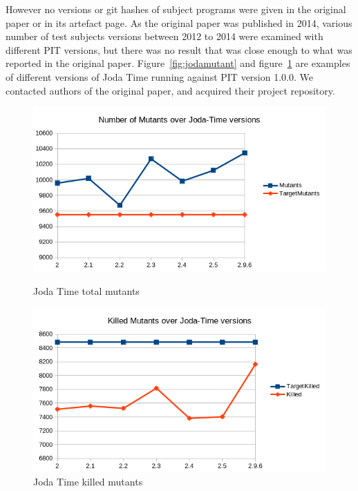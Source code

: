 However no versions or git hashes of subject programs were given in the original paper or in its artefact page. As the original paper was published in 2014, various number of test subjects versions between 2012 to 2014 were examined with different PIT versions, but there was no result that was close enough to what was reported in the original paper. Figure~\ref{fig:jodamutant} and figure~\ref{fig:jodakilled} are examples of different versions of Joda Time running against PIT version 1.0.0. We contacted authors of the original paper, and acquired their project repository.


\begin{figure}[h]
	\centering
	\begin{minipage}{0.4\textwidth}
		\centering
		\includegraphics[width=\textwidth]{Figure/joda_mutant.png}
		\caption{Joda Time total mutants}
		\label{fig:jodamutant}
	\end{minipage} %
	\begin{minipage}{0.4\textwidth}
		\centering
		\includegraphics[width=\textwidth]{Figure/joda_kill.png}
		\caption{Joda Time killed mutants}
		\label{fig:jodakilled}
	\end{minipage}
\end{figure}

